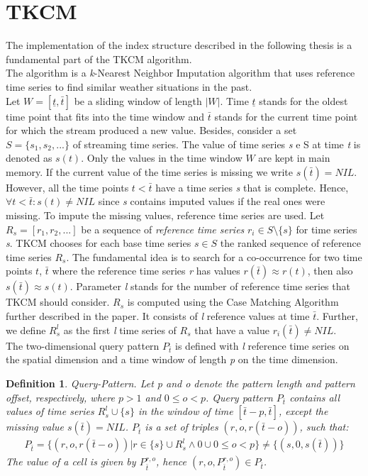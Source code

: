 \documentclass[abstracton,12pt]{scrreprt}
\begin{document}
\section{TKCM}
\label{sec:TKCM}
The implementation of the index structure described in the following thesis is a fundamental part of the TKCM algorithm.\\
The algorithm is a \emph{k}-Nearest Neighbor Imputation algorithm that uses reference time series to find similar weather situations in the past. \\Let $W=[ \underline{t}, \bar{t} ]$ be a sliding window of length $|W|$. Time $\underline{t}$ stands for the oldest time point that fits into the time window and $\bar{t}$ stands for the current time point for which the stream produced a new value. Besides, consider a set $S = \{s_1,s_2,...\}$ of streaming time series. The value of time series \emph{s} e S at time \emph{t} is denoted as $s(t)$. Only the values in the time window $W$ are kept in main memory. If the current value of the time series is missing we write $s(\bar{t})=NIL$. However, all the time points $t < \bar{t}$ have a time series \emph{s} that is complete. Hence, $\forall t < \bar{t} : s(t) \ne NIL$ since \emph{s} contains imputed values if the real ones were missing. To impute the missing values, reference time series are used. Let $R_s = [r_1, r_2, ...]$ be a sequence of \emph{reference time series} $r_i \in S \setminus \{s\}$ for time series \emph{s}. TKCM chooses for each base time series $s \in S$ the ranked sequence of reference time series $R_s$. The fundamental idea is to search for a co-occurrence for two time points $t$, $\bar{t}$ where the reference time series \emph{r} has values $r(\bar{t})\approx r(t)$, then also $s(\bar{t}) \approx s(t)$. Parameter \emph{l} stands for the number of reference time series that TKCM should consider. $R_s$ is computed using the Case Matching Algorithm further described in the paper. It consists of \emph{l} reference values at time $\bar{t}$. Further, we define $R_s^l$ as the first \emph{l} time series of $R_s$ that have a value $r_i(\bar{t}) \ne NIL$. \\
The two-dimensional query pattern $P_{\bar{t}}$ is defined with \emph{l} reference time series on the spatial dimension and a time window of length \emph{p} on the time dimension.
\newtheorem{defn}{Definition}[section]
\begin{defn}
	Query-Pattern. Let p and o denote the pattern length and pattern offset, respectively, where $p > 1$ and $0 \leq o < p$. Query pattern $P_{\bar{t}}$ contains all values of time series $R_s^l \cup \{s\}$ in the window of time $[\bar{t} - p, \bar{t}]$, except the missing value $s(\bar{t}) = NIL$. $P_{\bar{t}}$ is a set of triples $(r,o,r( \bar{t}-o))$, such that:
	\begin{align*}
P_{\bar{t}}=\{(r,o,r( \bar{t}-o))| r \in \{s\} \cup R_s^l \land 0 \cup 0 \leq o < p\} \ne \{(s,0,s(\bar{t}))\}
	\end{align*}
	The value of a cell is given by $P_{\bar{t}}^{r,o}$, hence $(r, o, P_{\bar{t}}^{r,o}) \in P_{\bar{t}}$.
\end{defn}
\end{document}
